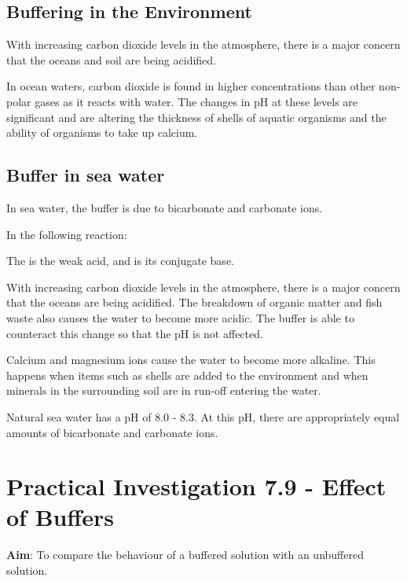 	\subsection{Buffering in the Environment}
	
		With increasing carbon dioxide levels in the atmosphere, there is a major concern that the oceans and soil are being acidified.

		In ocean waters, carbon dioxide is found in higher concentrations than other non-polar gases as it reacts with water. The changes in pH at these levels are significant and are altering the thickness of shells of aquatic organisms and the ability of organisms to take up calcium.

	\subsection{Buffer in sea water}
	
		In sea water, the buffer is due to bicarbonate and carbonate ions.

		In the following reaction:

		\begin{center}
		\end{center}

		The  is the weak acid, and  is its conjugate base.

		With increasing carbon dioxide levels in the atmosphere, there is a major concern that the oceans are being acidified. The breakdown of organic matter and fish waste also causes the water to become more acidic. The buffer is able to counteract this change so that the pH is not affected.

		Calcium and magnesium ions cause the water to become more alkaline. This happens when items such as shells are added to the environment and when minerals in the surrounding soil are in run-off entering the water.

		Natural sea water has a pH of 8.0 - 8.3. At this pH, there are appropriately equal amounts of bicarbonate and carbonate ions.

\section{Practical Investigation 7.9 - Effect of Buffers}

	\textbf{Aim}: To compare the behaviour of a buffered solution with an unbuffered solution.

